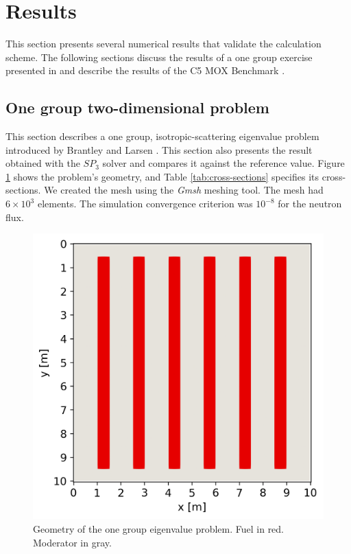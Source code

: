\documentclass{anstrans}
\begin{document}
\section{Results}

This section presents several numerical results that validate the calculation scheme.
The following sections discuss the results of a one group exercise presented in \cite{brantley_simplifiedP3_2000} and describe the results of the C5 MOX Benchmark \cite{cavarec_benchmark_1994}.

\subsection{One group two-dimensional problem}

This section describes a one group, isotropic-scattering eigenvalue problem introduced by Brantley and Larsen \cite{brantley_simplifiedP3_2000}.
This section also presents the result obtained with the $SP_3$ solver and compares it against the reference value.
Figure \ref{fig:2D} shows the problem's geometry, and Table \ref{tab:cross-sections} specifies its cross-sections.
We created the mesh using the \textit{Gmsh} \cite{geuzaine_gmsh_2009} meshing tool.
The mesh had $6 \times 10^{3}$ elements.
The simulation convergence criterion was $10^{-8}$ for the neutron flux.

\begin{figure}[H] %
    \centering
    \includegraphics[width=0.8\linewidth]{figures/mesh2.png}
    \hfill
    \caption{Geometry of the one group eigenvalue problem. Fuel in red. Moderator in gray.}
    \label{fig:2D}
\end{figure}
\end{document}
